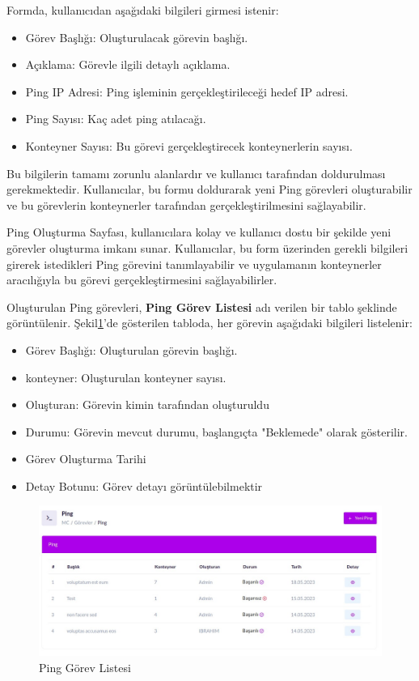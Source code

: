 Formda, kullanıcıdan aşağıdaki bilgileri girmesi istenir:
\begin{itemize}
	\item Görev Başlığı: Oluşturulacak görevin başlığı.
	\item Açıklama: Görevle ilgili detaylı açıklama.
	\item Ping IP Adresi: Ping işleminin gerçekleştirileceği hedef IP adresi.
	\item Ping Sayısı: Kaç adet ping atılacağı.
	\item Konteyner Sayısı: Bu görevi gerçekleştirecek konteynerlerin sayısı.
\end{itemize}

Bu bilgilerin tamamı zorunlu alanlardır ve kullanıcı tarafından doldurulması gerekmektedir. Kullanıcılar, bu formu doldurarak yeni Ping görevleri oluşturabilir ve bu görevlerin konteynerler tarafından gerçekleştirilmesini sağlayabilir.

Ping Oluşturma Sayfası, kullanıcılara kolay ve kullanıcı dostu bir şekilde yeni görevler oluşturma imkanı sunar. Kullanıcılar, bu form üzerinden gerekli bilgileri girerek istedikleri Ping görevini tanımlayabilir ve uygulamanın konteynerler aracılığıyla bu görevi gerçekleştirmesini sağlayabilirler.

Oluşturulan Ping görevleri, \textbf{Ping Görev Listesi} adı verilen bir tablo şeklinde görüntülenir. Şekil\ref{fig:ping_list}'de gösterilen tabloda, her görevin aşağıdaki bilgileri listelenir:

\begin{itemize}
	\item Görev Başlığı: Oluşturulan görevin başlığı.
	\item konteyner: Oluşturulan konteyner sayısı.
	\item Oluşturan: Görevin kimin tarafından oluşturuldu
	\item Durumu: Görevin mevcut durumu, başlangıçta "Beklemede" olarak gösterilir.
	\item Görev Oluşturma Tarihi
	\item Detay Botunu: Görev detayı görüntülebilmektir
\end{itemize}

\begin{figure}[ht]
	\centering
	\includegraphics[width=0.7\linewidth]{images/ping_list.jpeg}
	\caption{Ping Görev Listesi}
	\label{fig:ping_list}
\end{figure}

